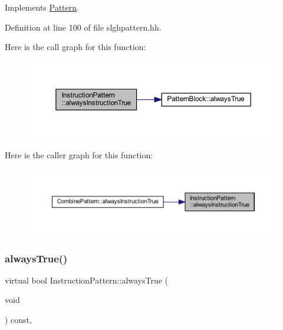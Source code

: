 Implements \mbox{\hyperlink{class_pattern_a62dd2f6b8bbb33279586739924ba4fa9}{Pattern}}.



Definition at line 100 of file slghpattern.\+hh.

Here is the call graph for this function\+:
\nopagebreak
\begin{figure}[H]
\begin{center}
\leavevmode
\includegraphics[width=350pt]{class_instruction_pattern_a82ae35b557a32c6f208c6ff19967173b_cgraph}
\end{center}
\end{figure}
Here is the caller graph for this function\+:
\nopagebreak
\begin{figure}[H]
\begin{center}
\leavevmode
\includegraphics[width=350pt]{class_instruction_pattern_a82ae35b557a32c6f208c6ff19967173b_icgraph}
\end{center}
\end{figure}
\mbox{\label{class_instruction_pattern_a06048b3a010b4822734d34774184f02d}} 
\subsubsection{\texorpdfstring{alwaysTrue()}{alwaysTrue()}}
{\footnotesize\ttfamily virtual bool Instruction\+Pattern\+::always\+True (\begin{DoxyParamCaption}\item[{void}]{ }\end{DoxyParamCaption}) const\hspace{0.3cm}{\ttfamily [inline]}, {\ttfamily [virtual]}}



